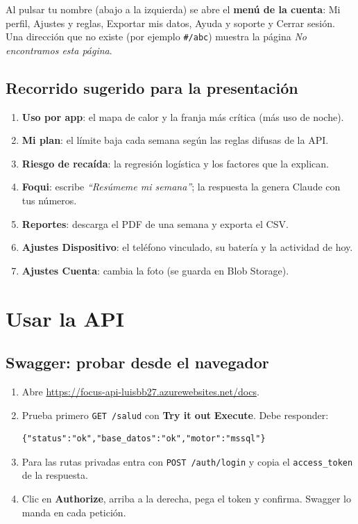 \documentclass[11pt,a4paper]{article}
\newcommand{\ruta}[1]{\texttt{\color{marino}#1}}
\newcommand{\menu}[1]{\textsf{\textbf{#1}}}
\begin{document}
\noindent Al pulsar tu nombre (abajo a la izquierda) se abre el \textbf{menú de la cuenta}: Mi perfil,
Ajustes y reglas, Exportar mis datos, Ayuda y soporte y Cerrar sesión. Una dirección que no existe
(por ejemplo \texttt{\#/abc}) muestra la página \emph{No encontramos esta página}.

\subsection{Recorrido sugerido para la presentación}
\begin{enumerate}[leftmargin=*]
  \item \textbf{Uso por app}: el mapa de calor y la franja más crítica (más uso de noche).
  \item \textbf{Mi plan}: el límite baja cada semana según las reglas difusas de la API.
  \item \textbf{Riesgo de recaída}: la regresión logística y los factores que la explican.
  \item \textbf{Foqui}: escribe \emph{``Resúmeme mi semana''}; la respuesta la genera Claude con tus números.
  \item \textbf{Reportes}: descarga el PDF de una semana y exporta el CSV.
  \item \textbf{Ajustes \textrightarrow{} Dispositivo}: el teléfono vinculado, su batería y la actividad de hoy.
  \item \textbf{Ajustes \textrightarrow{} Cuenta}: cambia la foto (se guarda en Blob Storage).
\end{enumerate}

\section{Usar la API}

\subsection{Swagger: probar desde el navegador}
\begin{enumerate}[leftmargin=*]
  \item Abre \url{https://focus-api-luisbb27.azurewebsites.net/docs}.
  \item Prueba primero \ruta{GET /salud} con \menu{Try it out} \textrightarrow{} \menu{Execute}. Debe responder:
\begin{lstlisting}
{"status":"ok","base_datos":"ok","motor":"mssql"}
\end{lstlisting}
  \item Para las rutas privadas entra con \ruta{POST /auth/login} y copia el \texttt{access\_token} de la respuesta.
  \item Clic en \menu{Authorize}, arriba a la derecha, pega el token y confirma. Swagger lo manda en cada petición.
\end{enumerate}
\end{document}

